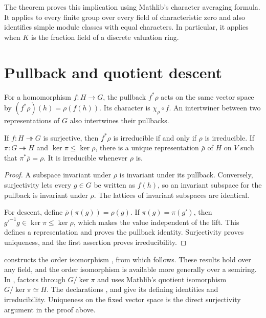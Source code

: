 \begin{implementation}
The theorem
proves this implication using Mathlib's character averaging formula. It applies
to every finite group over every field of characteristic zero and also
identifies simple module classes with equal characters. In particular,
it applies when $K$ is the fraction field of a discrete valuation ring.
\end{implementation}

\section{Pullback and quotient descent}
\label{lib:ordinary:pullback}

For a homomorphism $f:H\to G$, the pullback $f^*\rho$ acts on the same
vector space by $(f^*\rho)(h)=\rho(f(h))$. Its character is
$\chi_\rho\circ f$. An intertwiner between two representations of $G$
also intertwines their pullbacks.

\begin{proposition}
\label{lib:ordinary:surjective-pullback}
If $f:H\twoheadrightarrow G$ is surjective, then $f^*\rho$ is irreducible
if and only if $\rho$ is irreducible. If $\pi:G\twoheadrightarrow H$ and
$\ker \pi\leq\ker\rho$, there is a unique representation $\bar\rho$ of $H$
on $V$ such that $\pi^*\bar\rho=\rho$. It is irreducible whenever $\rho$ is.
\end{proposition}
\begin{proof}
A subspace invariant under $\rho$ is invariant under its pullback. Conversely,
surjectivity lets every $g\in G$ be written as $f(h)$, so an invariant
subspace for the pullback is invariant under $\rho$. The lattices of
invariant subspaces are identical.

For descent, define $\bar\rho(\pi(g))=\rho(g)$. If $\pi(g)=\pi(g')$, then
$g'^{-1}g\in\ker \pi\leq\ker\rho$, which makes the value independent of the
lift. This defines a representation and proves the pullback identity.
Surjectivity proves uniqueness, and the first assertion proves
irreducibility.
\end{proof}

\begin{implementation}
 constructs the order isomorphism
, from which
 follows. These results
hold over any field, and the order isomorphism is available more generally
over a semiring. In
,
 factors through $G/\ker \pi$ and uses Mathlib's quotient
isomorphism $G/\ker \pi\simeq H$. The declarations
,  and
 give its defining identities and irreducibility.
Uniqueness on the fixed vector space is the direct surjectivity argument
in the proof above.
\end{implementation}

